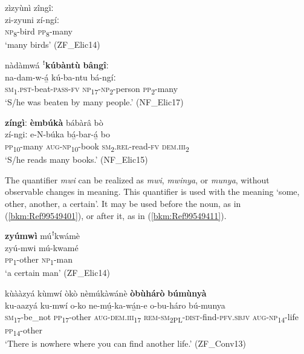 \ea
\label{bkm:Ref99549339}
zìzyùnì zîngîː\\
\gll zi-zyuni  zí-ngíː\\
\textsc{np}\textsubscript{8}-bird  \textsc{pp}\textsubscript{8}-many\\
\glt ‘many birds’ (ZF\_Elic14)
\z

\ea
\label{bkm:Ref99549360}
nàdàmwá ꜝ\textbf{kúbàntù} \textbf{bângîː}\\
\gll na-dam-w-á̲      kú-ba-ntu    bá-ngíː\\
\textsc{sm}\textsubscript{1}.\textsc{pst}-beat-\textsc{pass}-\textsc{fv}  \textsc{np}\textsubscript{17}-\textsc{np}\textsubscript{2}-person  \textsc{pp}\textsubscript{2}-many\\
\glt ‘S/he was beaten by many people.’ (NF\_Elic17)
\z

\ea
\label{bkm:Ref99549341}
\textbf{zíngìː} \textbf{èmbúkà} bábàrâ bò\\
\gll zí-ngiː  e-N-búka    bá̲-bar-á̲    bo\\
\textsc{pp}\textsubscript{10}-many  \textsc{aug}-\textsc{np}\textsubscript{10}-book  \textsc{sm}\textsubscript{2}.\textsc{rel}-read-\textsc{fv}  \textsc{dem}.\textsc{iii}\textsubscript{2}\\
\glt ‘S/he reads many books.’ (NF\_Elic15)
\z

The quantifier \textit{mwi} can be realized as \textit{mwi}, \textit{mwinya}, or \textit{munya}, without observable changes in meaning. This quantifier is used with the meaning ‘some, other, another, a certain’. It may be used before the noun, as in (\ref{bkm:Ref99549401}), or after it, as in (\ref{bkm:Ref99549411}).

\ea
\label{bkm:Ref99549401}
\textbf{zyúmwì} múꜝkwámè\\
\gll zyú-mwi  mú-kwamé\\
\textsc{pp}\textsubscript{1}-other  \textsc{np}\textsubscript{1}-man\\
\glt ‘a certain man’ (ZF\_Elic14)
\z

\ea
\label{bkm:Ref99549411}
kùààzyá kùmwí òkò nèmúkàwánè \textbf{òbùhárò} \textbf{búmùnyà}\\
\gll ku-aazyá  ku-mwí  o-ko      ne-mú̲-ka-wá̲n-e o-bu-háro    bú-munya\\
\textsc{sm}\textsubscript{17}-be\_not  \textsc{pp}\textsubscript{17}-other  \textsc{aug}-\textsc{dem}.\textsc{iii}\textsubscript{17}  \textsc{rem}-\textsc{sm}\textsubscript{2PL}-\textsc{dist}-find-\textsc{pfv}.\textsc{sbjv} \textsc{aug}-\textsc{np}\textsubscript{14}-life  \textsc{pp}\textsubscript{14}-other\\
\glt ‘There is nowhere where you can find another life.’ (ZF\_Conv13)
\z

